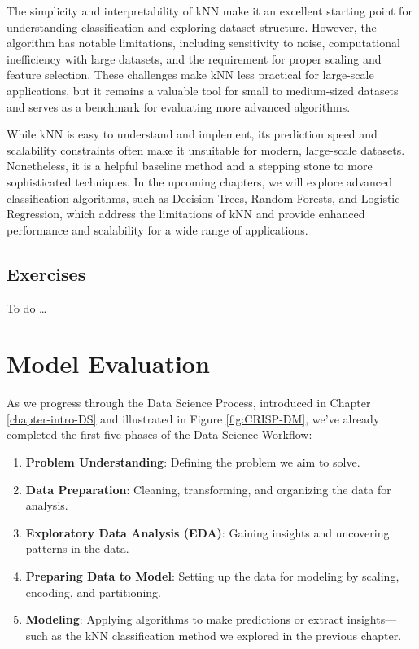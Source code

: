 \documentclass[
]{book}
\providecommand{\tightlist}{%
  \setlength{\itemsep}{0pt}\setlength{\parskip}{0pt}}
\theoremstyle{definition}
\theoremstyle{definition}
\theoremstyle{definition}
\theoremstyle{definition}
\theoremstyle{remark}
\begin{document}
The simplicity and interpretability of kNN make it an excellent starting point for understanding classification and exploring dataset structure. However, the algorithm has notable limitations, including sensitivity to noise, computational inefficiency with large datasets, and the requirement for proper scaling and feature selection. These challenges make kNN less practical for large-scale applications, but it remains a valuable tool for small to medium-sized datasets and serves as a benchmark for evaluating more advanced algorithms.

While kNN is easy to understand and implement, its prediction speed and scalability constraints often make it unsuitable for modern, large-scale datasets. Nonetheless, it is a helpful baseline method and a stepping stone to more sophisticated techniques. In the upcoming chapters, we will explore advanced classification algorithms, such as Decision Trees, Random Forests, and Logistic Regression, which address the limitations of kNN and provide enhanced performance and scalability for a wide range of applications.

\section{Exercises}\label{exercises-6}

To do \ldots{}

\chapter{Model Evaluation}\label{chapter-evaluation}

As we progress through the Data Science Process, introduced in Chapter \ref{chapter-intro-DS} and illustrated in Figure \ref{fig:CRISP-DM}, we've already completed the first five phases of the Data Science Workflow:

\begin{enumerate}
\def\labelenumi{\arabic{enumi}.}
\tightlist
\item
  \textbf{Problem Understanding}: Defining the problem we aim to solve.\\
\item
  \textbf{Data Preparation}: Cleaning, transforming, and organizing the data for analysis.\\
\item
  \textbf{Exploratory Data Analysis (EDA)}: Gaining insights and uncovering patterns in the data.\\
\item
  \textbf{Preparing Data to Model}: Setting up the data for modeling by scaling, encoding, and partitioning.\\
\item
  \textbf{Modeling}: Applying algorithms to make predictions or extract insights---such as the kNN classification method we explored in the previous chapter.
\end{enumerate}
\end{document}
